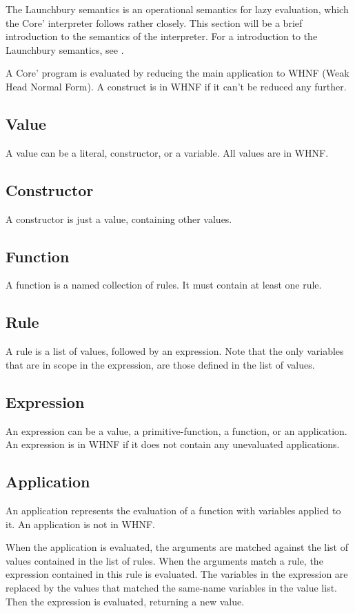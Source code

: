 The Launchbury semantics is an operational semantics for 
lazy evaluation, which the Core' interpreter follows rather closely. 
This section will be a brief introduction to the semantics of the interpreter.
For a introduction to 
the Launchbury semantics, see \cite{launchbury1993natural}. 

A Core' program is evaluated by reducing the main application to WHNF 
(Weak Head Normal Form). A construct is in WHNF if it can't be
reduced any further.

\subsection{Value}
A value can be a literal, constructor, or a variable. All values are in WHNF.

\subsection{Constructor}
A constructor is just a value, containing other values.

\subsection{Function}
A function is a named collection of rules. It must contain at least one rule.

\subsection{Rule}
A rule is a list of values, followed by an expression. Note that the only variables
that are in scope in the expression, are those defined in the list of values.

\subsection{Expression}
An expression can be a value, a primitive-function, a function, or an application.
An expression is in WHNF if it does not contain any unevaluated applications.

\subsection{Application}
An application represents the evaluation of a function with variables applied to it.
An application is not in WHNF.

When the application is evaluated, the arguments are matched against the list of 
values contained in the list of rules. 
When the arguments match a rule, the expression contained in this rule is evaluated. 
The variables in the expression are replaced by the values that matched the same-name
variables in the value list. Then the expression is evaluated, returning a new value.

